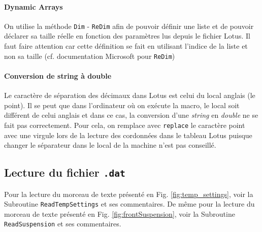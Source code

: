 \paragraph{Dynamic Arrays} On utilise la méthode \texttt{Dim} - \texttt{ReDim} afin de pouvoir définir une liste et de pouvoir déclarer sa taille réelle en fonction des paramètres lus depuis le fichier Lotus. Il faut faire attention car cette définition se fait en utilisant l'indice de la liste et non sa taille (cf. documentation Microsoft pour \texttt{ReDim})

\paragraph{Conversion de string à double} Le caractère de séparation des décimaux dans Lotus est celui du local anglais (le point). Il se peut que dans l'ordinateur où on exécute la macro, le local soit différent de celui anglais et dans ce cas, la conversion d'une \textit{string} en \textit{double} ne se fait pas correctement. Pour cela, on remplace avec \texttt{replace} le caractère point avec une virgule lors de la lecture des cordonnées dans le tableau Lotus puisque changer le séparateur dans le local de la machine n'est pas conseillé.

\subsection{Lecture du fichier \texttt{.dat}}%

\par Pour la lecture du morceau de texte présenté en Fig. \ref{fig:temp_settings}, voir la Subroutine \texttt{ReadTempSettings} et ses commentaires.
De même pour la lecture du morceau de texte présenté en Fig. \ref{fig:frontSuspension}, voir la Subroutine \texttt{ReadSuspension} et ses commentaires.

